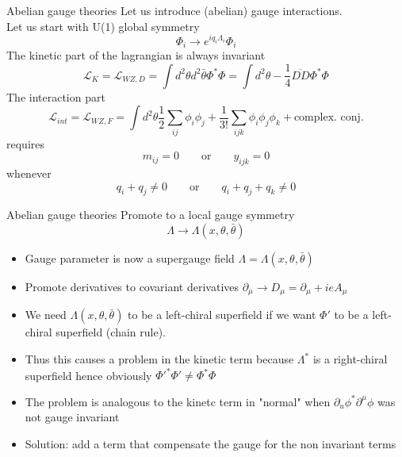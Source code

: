 \documentclass[10pt]{beamer}
\begin{document}
\begin{frame}{Abelian gauge theories}
Let us introduce (abelian) gauge interactions. \\ 
Let us start with U(1) global symmetry 
\begin{equation*}
    \Phi_i \rightarrow e^{iq_i\Lambda_i}\Phi_i
\end{equation*}
The kinetic part of the lagrangian is always invariant
\begin{equation*}
    \mathcal{L}_{K} = \mathcal{L}_{WZ,D} = \int d^2\theta d^2 \bar\theta \Phi^*\Phi = \int d^2\theta -\frac{1}{4} \overline{D D} \Phi^*\Phi
\end{equation*}
The interaction part 
\begin{equation*}
    \mathcal{L}_{int} = \mathcal{L}_{WZ,F} = \int d^2\theta \frac{1}{2} \sum_{ij} \phi_i \phi_j + \frac{1}{3!} \sum_{ijk} \phi_i \phi_j \phi_k + \text{complex. conj.}
\end{equation*}
requires
\begin{equation*}
    m_{ij} = 0 \qquad \text{or} \qquad y_{ijk} = 0
\end{equation*}
whenever
\begin{equation*}
    q_i + q_j \neq 0 \qquad \text{or} \qquad q_i + q_j + q_k \neq 0
\end{equation*}
\end{frame}

\begin{frame}{Abelian gauge theories}
Promote to a local gauge symmetry
\begin{equation*}
    \Lambda \to \Lambda(x, \theta, \bar\theta)
\end{equation*}
\begin{itemize}
    \item Gauge parameter is now a supergauge field $\Lambda = \Lambda(x, \theta, \bar\theta)$
    \item Promote derivatives to covariant derivatives $\partial_\mu \to D_\mu = \partial_\mu + ieA_{\mu}$
    \item We need $\Lambda(x, \theta, \bar\theta)$ to be a left-chiral superfield if we want $\Phi'$ to be a left-chiral superfield (chain rule). \\ 
    \item Thus this causes a problem in the kinetic term because $\Lambda^*$ is a right-chiral superfield
    hence obviously $\Phi'^*\Phi' \neq \Phi^*\Phi$
    \item The problem is analogous to the kinetc term in "normal" when $\partial_u \phi^* \partial^\mu \phi$ was not gauge invariant
    \item Solution: add a term that compensate the gauge for the non invariant terms
\end{itemize}
\end{frame}
\end{document}
